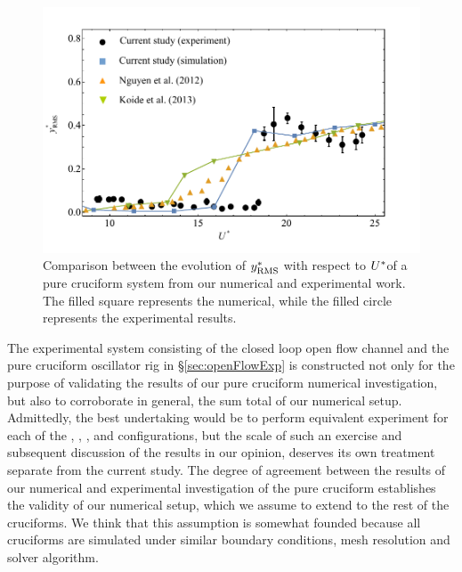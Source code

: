 \documentclass[oneside]{utmthesis}
\begin{document}
\begin{figure}
  \centering
  \includegraphics[width=1\textwidth]{figs/expCompareAmp}
  \caption{Comparison between the evolution of $y^{*}_{\text{RMS}}$ with respect to $U^{*}$of a pure cruciform system from our numerical and experimental work. The filled square represents the numerical, while the filled circle represents the experimental results.}
  \label{fig:expCompareAmp}
\end{figure}

The experimental system consisting of the closed loop open flow channel and the pure cruciform oscillator rig in \S\ref{sec:openFlowExp} is constructed not only for the purpose of validating the results of our pure cruciform numerical investigation, but also to corroborate in general, the sum total of our numerical setup. Admittedly, the best undertaking would be to perform equivalent experiment for each of the \angfi{}, \angfo{}, \angth{}, \angtw{} and \angon{} configurations, but the scale of such an exercise and subsequent discussion of the results in our opinion, deserves its own treatment separate from the current study. The degree of agreement between the results of our numerical and experimental investigation of the pure cruciform establishes the validity of our numerical setup, which we assume to extend to the rest of the cruciforms. We think that this assumption is somewhat founded because all cruciforms are simulated under similar boundary conditions, mesh resolution and solver algorithm.
\end{document}
